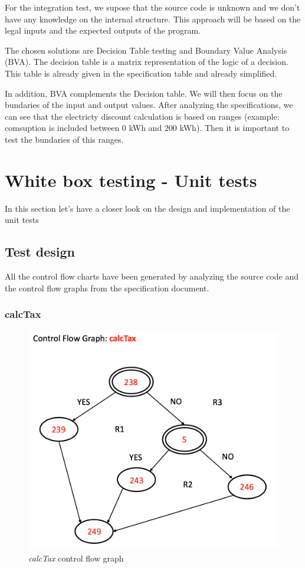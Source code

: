 \documentclass{article}
\begin{document}
    For the integration test, we supose that the source code is unknown and we don't have any knowledge on the internal structure.
    This approach will be based on the legal inputs and the expected outputs of the program. 
    
    The chosen solutions are Decision Table testing and Boundary Value Analysis (BVA). The decision table is a matrix representation of the logic of a decision.
    This table is already given in the specification table and already simplified. 

    In addition, BVA complements the Decision table. We will then focus on the bundaries of the input and output values. After analyzing the specifications, we can see
    that the electricty discount calculation is based on ranges (example: comsuption is included between 0 kWh and 200 kWh). Then it is important to test the bundaries of this ranges.

    \newpage

    \section{White box testing - Unit tests}
    
    In this section let's have a closer look on the design and implementation of the unit tests

    \subsection{Test design}
    \label{section:testdesign}

    All the control flow charts have been generated by analyzing the source code and the control flow graphs from the specification document.

    \subsubsection{calcTax}

    \begin{figure}[h!]
        \includegraphics[width=0.5\linewidth, center]{cfg/calcTax.png}
        \caption{\textit{calcTax} control flow graph}
        \label{fig:cfgTax}
    \end{figure}
\end{document}
